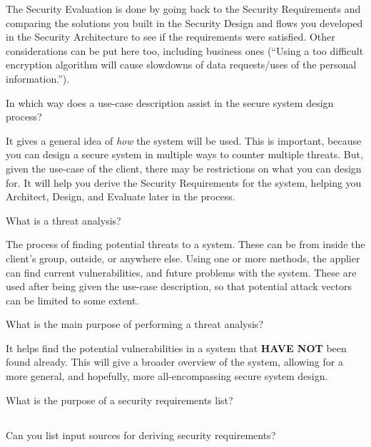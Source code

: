 \begin{questions}
\begin{parts}
\begin{solution}
      The Security Evaluation is done by going back to the Security Requirements and comparing the solutions you built in the Security Design and flows you developed in the Security Architecture to see if the requirements were satisfied.
      Other considerations can be put here too, including business ones (``Using a too difficult encryption algorithm will cause slowdowns of data requests/uses of the personal information.'').
    \end{solution}
  \end{parts}

\question{} In which way does a use-case description assist in the secure system design process?
  \begin{solution}
    It gives a general idea of \emph{how} the system will be used.
    This is important, because you can design a secure system in multiple ways to counter multiple threats.
    But, given the use-case of the client, there may be restrictions on what you can design for.
    It will help you derive the Security Requirements for the system, helping you Architect, Design, and Evaluate later in the process.
  \end{solution}

\question{} What is a threat analysis?
  \begin{solution}
    The process of finding potential threats to a system.
    These can be from inside the client's group, outside, or anywhere else.
    Using one or more methods, the applier can find current vulnerabilities, and future problems with the system.
    These are used after being given the use-case description, so that potential attack vectors can be limited to some extent.
  \end{solution}

\question{} What is the main purpose of performing a threat analysis?
  \begin{solution}
    It helps find the potential vulnerabilities in a system that \textbf{HAVE NOT} been found already.
    This will give a broader overview of the system, allowing for a more general, and hopefully, more all-encompassing secure system design.
  \end{solution}

\question{} What is the purpose of a security requirements list?
  \begin{parts}
  \part{} Can you list input sources for deriving security requirements?

\end{parts}
\end{questions}
